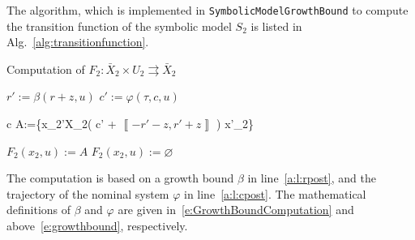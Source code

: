 \documentclass[a4paper]{amsart}
\newcommand{\segcc}[1]{\ensuremath{{\left\llbracket#1\right\rrbracket}}}
\renewcommand{\emptyset}{{\varnothing}}
\begin{document}
The algorithm, which is implemented in {\tt\small SymbolicModelGrowthBound} to
compute the  transition function of the symbolic model $S_2$ is
listed in Alg.~\ref{alg:transitionfunction}.
\begin{algorithm}[h]
\caption{Computation of $F_2:\bar X_2\times U_2\rightrightarrows \bar
X_2$}\label{alg:transitionfunction}
\begin{algorithmic}[1]
\ForAll{$c+\segcc{-r,r}\in \bar X_2$ and $u\in U_2$}
\State $r':=\beta(r+z,u)$
\label{a:l:rpost}
\State $c':=\varphi(\tau,c,u)$
\label{a:l:cpost}
\State   \begin{IEEEeqnarraybox}{c}
    A:=\{x_2'\in X_2\mid \left( c' + \segcc{-r'-z,r'+z} \right) \cap x'_2\neq\emptyset\}
         \end{IEEEeqnarraybox}
\State $F_2(x_2,u):=A$
\Else
\State $F_2(x_2,u):=\emptyset$
\EndIf
\EndFor
\end{algorithmic}
\end{algorithm}
The computation is based on a growth bound $\beta$ in line~\ref{a:l:rpost}, and the
trajectory of the nominal system $\varphi$
in line~\ref{a:l:cpost}. The mathematical definitions of $\beta$ and $\varphi$
are given in~\eqref{e:GrowthBoundComputation} and above~\eqref{e:growthbound},
respectively.
\end{document}
